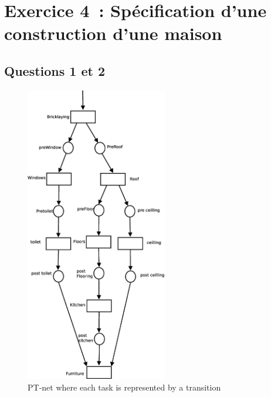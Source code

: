 \section*{Exercice 4~: Spécification d'une construction d'une maison}

\subsection*{Questions 1 et 2}

\begin{figure}[h!]
\begin{center}
\includegraphics[height = 13cm]{exo41.eps} 
\caption{PT-net where each task is represented by a transition}
\end{center} 
\end{figure} 


